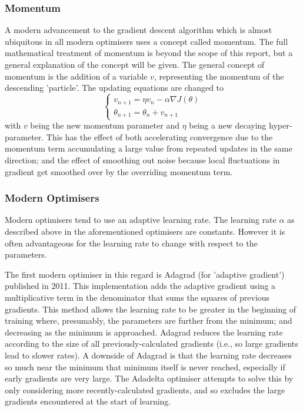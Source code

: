 \documentclass[a4paper,fleqn,usenatbib]{mnras}
\begin{document}
\subsubsection{Momentum}
A modern advancement to the gradient descent algorithm which is almost ubiquitous in all modern optimisers uses a concept called momentum. The full mathematical treatment of momentum is beyond the scope of this report, but a general explanation of the concept will be given. \citep{Momentum} The general concept of momentum is the addition of a variable $v$, representing the momentum of the descending 'particle'. The updating equations are changed to 
\begin{equation}
\begin{cases} v_{n+1}=\eta v_{n}-\alpha\nabla J(\theta)  \\ \theta_{n+1}=\theta_{n}+v_{n+1}\end{cases}
\end{equation}
with $v$ being the new momentum parameter and $\eta$ being a new decaying hyper-parameter. This has the effect of both accelerating convergence due to the momentum term accumulating a large value from repeated updates in the same direction; and the effect of smoothing out noise because local fluctuations in gradient get smoothed over by the overriding momentum term.

\subsubsection{Modern Optimisers}
\label{section:modern optimizers}
Modern optimisers tend to use an adaptive learning rate. The learning rate $\alpha$ as described above in the aforementioned optimisers are constants. However it is often advantageous for the learning rate to change with respect to the parameters.
 
 The first modern optimiser in this regard is Adagrad (for 'adaptive gradient') published in 2011. \citep{AdaGrad} This implementation adds the adaptive gradient using a multiplicative term in the denominator that sums the squares of previous gradients. This method allows the learning rate to be greater in the beginning of training where, presumably, the parameters are further from the minimum; and decreasing as the minimum is approached. Adagrad reduces the learning rate according to the size of all previously-calculated gradients (i.e., so large gradients lead to slower rates). A downside of Adagrad is that the learning rate decreases so much near the minimum that minimum itself is never reached, especially if early gradients are very large. The Adadelta optimiser attempts to solve this by only considering more recently-calculated gradients, and so excludes the large gradients encountered at the start of learning. \citep{AdaDelta}
\end{document}

